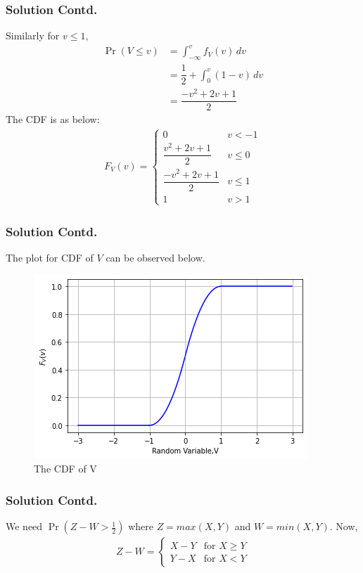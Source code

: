 \documentclass{beamer}
\providecommand{\pr}[1]{\ensuremath{\Pr\left(#1\right)}}
\begin{document}
\begin{frame}
 \frametitle{Solution Contd.}
 Similarly for $v \leq 1$,
\begin{align}
    \pr{V\leq v} &=  \int_{-\infty}^{v}f_{V}(v) \,dv  \\
          &=  \dfrac{1}{2} + \int_{0}^{v}(1-v)\,dv  \\
          &=  \dfrac{-v^2+2v+1}{2}
\end{align}
The CDF is as below: 
\begin{align}
\label{eq:cdf_v}
F_{V}(v)  = 
\begin{cases}
0 & v < -1
\\
\dfrac{v^2+2v + 1}{2} &  v \le 0
\\
\dfrac{-v^2+2v+1}{2} &  v \le 1
\\
1 & v > 1
\end{cases}
\end{align}
\end{frame}

\begin{frame}
\frametitle{Solution Contd.}
The plot for CDF of $V $ can be observed below.
\begin{figure}[!ht]
       \centering
    \includegraphics[scale=0.6] {Assignment_3_Fig_2.png}
    \caption{The CDF of V}
    \label{fig:The CDF of V}
\end{figure}
\end{frame}

\begin{frame}
\frametitle{Solution Contd.}
We need  $\pr{Z-W >\frac{1}{2}}$ where $Z = max(X,Y)$ and $W = min(X,Y)$. Now,
\begin{align}
Z-W  = 
\begin{cases}
X-Y & \text{for } X \geq Y
\\
Y-X & \text{for } X < Y
\end{cases}
\end{align}
\end{frame}
\end{document}
